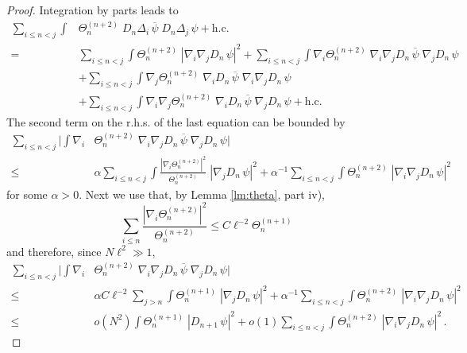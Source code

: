 \documentclass[11pt]{article}
\renewcommand{\a}{\alpha}
\begin{document}
\begin{proof}
Integration by parts leads to
\begin{equation}\label{eq:Hk-4-2}
\begin{split}
\sum_{i\leq n < j} \int &\Theta^{(n+2)}_n \; D_n \Delta_i \,
\overline{\psi} \; D_n \Delta_j \, \psi +\text{h.c.} \\ = \;
&\sum_{i\leq n < j} \int \Theta^{(n+2)}_n \; |\nabla_i \nabla_j D_n
\,\psi|^2 + \sum_{i\leq n < j} \int \nabla_i \Theta^{(n+2)}_n \;
\nabla_i \nabla_j D_n  \, \overline{\psi} \; \nabla_j D_n \, \psi
\\ &+ \sum_{i\leq n < j} \int
\nabla_j \Theta^{(n+2)}_n \; \nabla_i D_n  \, \overline{\psi} \;
\nabla_i \nabla_j D_n \, \psi
\\ &+ \sum_{i\leq n < j} \int
\nabla_i \nabla_j \Theta^{(n+2)}_n  \; \nabla_i D_n \,
\overline{\psi} \; \nabla_j D_n \, \psi +\text{h.c.}
\end{split}
\end{equation}
The second term on the r.h.s. of the last equation can be bounded by
\begin{equation}\begin{split}
\sum_{i\leq n < j} \Big| \int \nabla_i & \Theta^{(n+2)}_n \;
\nabla_i \nabla_j D_n \, \overline{\psi} \; \nabla_j D_n \, \psi
\Big| \\ \leq \; &\a \sum_{i\leq n < j} \int \frac{|\nabla_i
\Theta^{(n+2)}_n|^2}{\Theta^{(n+2)}_n} \; |\nabla_j D_n \, \psi|^2 +
\a^{-1} \sum_{i\leq n < j} \int \Theta^{(n+2)}_n \; |\nabla_i
\nabla_j D_n \, \psi|^2
\end{split}
\end{equation}
for some $\a >0$. Next we use that, by Lemma \ref{lm:theta}, part
iv),
\[ \sum_{i\leq n} \frac{|\nabla_i
\Theta^{(n+2)}_n|^2}{\Theta^{(n+2)}_n} \leq C \ell^{-2}
\Theta^{(n+1)}_{n} \] and therefore, since $N\ell^2 \gg 1$,
\begin{equation}\begin{split}\label{eq:Hk-4-3}
\sum_{i\leq n < j} \Big| \int \nabla_i & \Theta^{(n+2)}_n \;
\nabla_i \nabla_j D_n \, \overline{\psi} \; \nabla_j D_n \, \psi
\Big| \\ \leq \; &\a C \ell^{-2} \sum_{j >n} \int \Theta^{(n+1)}_{n}
\; |\nabla_j D_n \, \psi|^2 + \a^{-1} \sum_{i\leq n < j} \int
\Theta^{(n+2)}_n \; |\nabla_i \nabla_j D_n \, \psi|^2 \\ \leq \; & o
(N^2) \int \Theta^{(n+1)}_n \; |D_{n+1} \, \psi|^2 + o(1) \sum_{i
\leq n < j} \int \Theta^{(n+2)}_n \; |\nabla_i \nabla_j D_n \,
\psi|^2\,.
\end{split}

\end{equation}
\end{proof}
\end{document}
